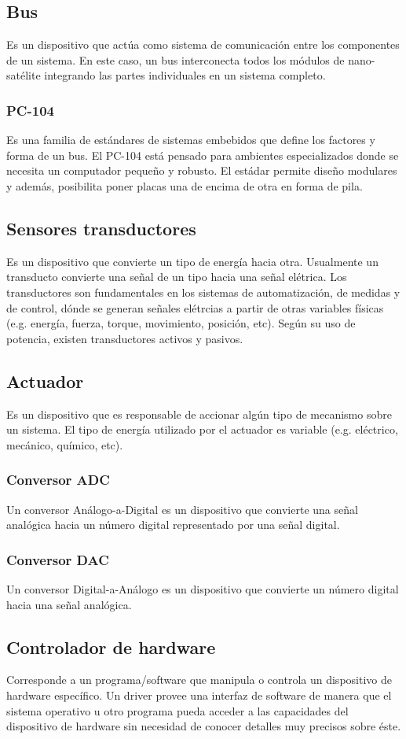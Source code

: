 \subsection{Bus}
Es un dispositivo que actúa como sistema de comunicación entre los componentes de un sistema. En este caso, un bus interconecta todos los módulos de nano-sat\'elite integrando las partes individuales en un sistema completo.
\subsubsection{PC-104}
Es una familia de estándares de sistemas embebidos que define los factores y forma de un bus. El PC-104 está pensado para ambientes especializados donde se necesita un computador pequeño y robusto. El estádar permite diseño modulares y además, posibilita poner placas una de encima de otra en forma de pila.
\subsection{Sensores transductores}
Es un dispositivo que convierte un tipo de energía hacia otra. Usualmente un transducto convierte una señal de un tipo hacia una señal el\'etrica. 
Los transductores son fundamentales en los sistemas de automatización, de medidas y de control, dónde se generan señales el\'etrcias a partir de otras variables físicas (e.g. energía, fuerza, torque, movimiento, posición, etc). Según su uso de potencia, existen transductores activos y pasivos.

\subsection{Actuador}
Es un dispositivo que es responsable de accionar algún tipo de mecanismo sobre un sistema. El tipo de energía utilizado por el actuador es variable (e.g. el\'ectrico, mecánico, químico, etc).
\subsubsection{Conversor ADC}
Un conversor Análogo-a-Digital es un dispositivo que convierte una señal analógica hacia un número digital representado por una señal digital.
\subsubsection{Conversor DAC}
Un conversor Digital-a-Análogo es un dispositivo que convierte un número digital hacia una señal analógica.
\subsection{Controlador de hardware}
Corresponde a un programa/software que manipula o controla un dispositivo de hardware específico. Un driver provee una interfaz de software de manera que el sistema operativo u otro programa pueda acceder a las capacidades del dispositivo de hardware sin necesidad de conocer detalles muy precisos sobre \'este.
